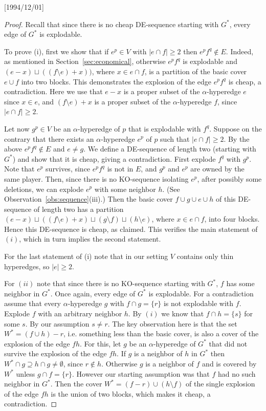 \NeedsTeXFormat{LaTeX2e}[1994/12/01]\documentclass[letterpaper, 11pt]{article}
\theoremstyle{definition}
\theoremstyle{remark}
\numberwithin{equation}{section}
\begin{document}
  \begin{proof}
    Recall that since there is no cheap DE-sequence starting with
    $G^*$, every edge of $G^*$ is explodable.

 To prove (i), first we show that if $e^p\in V$ with $|e\cap f| \geq 2$ then
 $e^pf^q\not\in E$. Indeed, as mentioned in
 Section~\ref{sec:economical}, otherwise  $e^pf^q$ is explodable and  
    $(e-x) \sqcup ((f\setminus e)+x))$, where $x\in e\cap
    f$, is a partition of the  basic cover $e\cup f$
    into two blocks.  This demonstrates the explosion of the edge
    $e^pf^q$ is cheap, a contradiction. Here
  we use that $e-x$ is a proper subset of the $\alpha$-hyperedge $e$
  since $x \in e$, and $(f\setminus e) +x$ is a proper subset of the
$\alpha$-hyperedge $f$, since $|e\cap f| \geq 2$.
 

Let now $g^p\in V$ be an $\alpha$-hyperedge of $p$ that is explodable
 with $f^q$. Suppose on the contrary that there exists an
 $\alpha$-hyperedge $e^p$ of $p$ such that $|e\cap f| \geq 2$.
By the above $e^pf^q\not\in E$ and $e\neq g$.
 We define a DE-sequence of length two (starting with $G^*$) and show that it is cheap,
giving a contradiction. 
First explode $f^q$ with $g^p$. Note that $e^p$ survives, since $e^pf^q$ is
not in $E$, and $g^p$ and $e^p$ are owned by the same player.
Then, since there is no KO-sequence isolating $e^p$, after
possibly some deletions, we can explode $e^p$ with some neighbor
$h$. (See Observation~\ref{obs:sequence}(iii).)
Then the basic cover $f\cup g\cup e\cup h$ of this DE-sequence of
length two has a partition $(e-x)\sqcup ((f\setminus e) +x)\sqcup (g\setminus
f)\sqcup (h\setminus e)$, where $x\in e\cap f$, into four blocks. 
Hence this DE-sequence is cheap, as claimed. This verifies the main
statement of $(i)$, which in turn implies the second statement.

For the last statement of (i) note that in our setting $V$ contains
only thin hyperedges, so $|e| \geq 2$.

For $(ii)$ note that since there is no KO-sequence starting with $G^*$, $f$ has some
neighbor in $G^*$. Once again, every edge of $G^*$ is
explodable. For a contradiction assume that
every $\alpha$-hyperedge $g$ with $f\cap g = \{ r\}$ is not
explodable with $f$. Explode $f$ with an arbitrary neighbor $h$. By $(i)$ we know that
$f\cap h=\{ s \}$ for some $s$. By our assumption $s\neq r$.
The key observation here is that the set $W^*=(f\cup h) -r$, i.e. something less than the
basic cover, is also a cover of the explosion of the edge $fh$.
For this, let $g$ be an $\alpha$-hyperedge of $G^*$ that did not
survive the explosion of the edge $fh$. If $g$ is a neighbor of $h$ in
$G^*$ then $W^*\cap g \supseteq h\cap g \neq \emptyset$, since $r\not\in
h$. Otherwise $g$ is a neighbor of $f$ and is covered by $W^*$
unless $g\cap f = \{ r\}$. However our starting assumption was that
$f$ had no such neighbor in $G^*$.
Then the cover $W^* = (f-r) \cup (h\setminus f)$ of the single explosion
of the edge $fh$ is the union of two blocks, which makes it cheap, a contradiction.
\end{proof}
\end{document}
